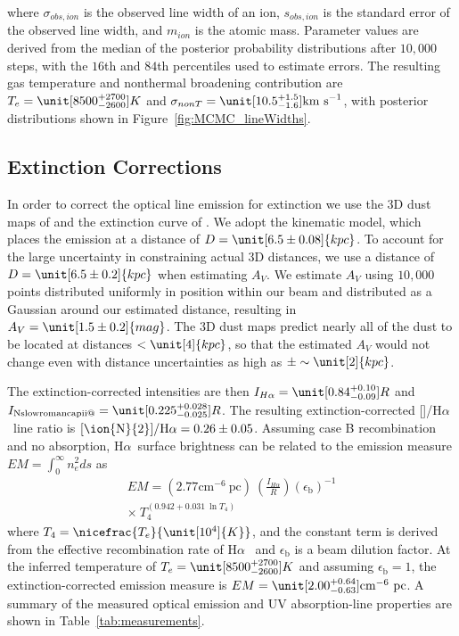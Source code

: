 \documentclass[twocolumn]{aastex63}
\makeatletter
\newcommand{\nii}{\ion{N}{2}}
\newcommand{\ha}{H\ensuremath{\alpha}}
\newcommand{\kms}{\mathrm{km~s}\ensuremath{^{-1}}}
\newcommand*{\rom}[1]{\expandafter\@slowromancap\romannumeral #1@}
\makeatother
\begin{document}
where $\sigma_{obs,ion}$ is the observed line width of an ion, $s_{obs,ion}$ is the standard error of the observed line width, and $m_{ion}$ is the atomic mass. Parameter values are derived from the median of the posterior probability distributions after $10,000$ steps, with the $16$th and $84$th percentiles used to estimate errors. The resulting gas temperature and nonthermal broadening contribution are $T_e = \unit[8500^{+2700}_{-2600}]{K}$ and $\sigma_{nonT} = \unit[10.5^{+1.5}_{-1.6}]{\kms}$, with posterior distributions shown in Figure~\ref{fig:MCMC_lineWidths}.

\subsection{Extinction Corrections} \label{sec:methods:extinct}
In order to correct the optical line emission for extinction we use the $3$D dust maps of \citet{Green2019} and the extinction curve of \citet{Fitzpatrick2007}. We adopt the \citet{DiTeodoro2018} kinematic model, which places the emission at a distance of  $D = \unit[6.5 \pm 0.08]{kpc}$. To account for the large uncertainty in constraining actual $3$D distances, we use a distance of $D = \unit[6.5 \pm 0.2]{kpc}$ when estimating $A_V$. We estimate $A_V$ using $10,000$ points distributed uniformly in position within our beam and distributed as a Gaussian around our estimated distance, resulting in $A_V = \unit[1.5 \pm 0.2]{mag}$. The $3$D dust maps predict nearly all of the dust to be located at distances $<\unit[4]{kpc}$, so that the estimated $A_V$ would not change even with distance uncertainties as high as $\pm \sim \unit[2]{kpc}$.

The extinction-corrected intensities are then $I_{\ha} = \unit[0.84^{+0.10}_{-0.09}]{R}$ and $I_{\textrm{N\rom{2}}} = \unit[0.225^{+0.028}_{-0.025}]{R}$. 
The resulting extinction-corrected [\nii]/\ha\ line ratio is $\textrm{[\nii]/\ha} = 0.26 \pm 0.05$. 
Assuming case B recombination and no absorption, \ha\ surface brightness can be related to the emission measure $EM = \int_0^{\infty}{n_e^2 ds}$ as 
\begin{equation}
\begin{split}
    EM = \left(2.77 \textrm{cm}^{-6}~\textrm{pc}\right)~
     \left(\frac{I_{\ha}}{R}\right) \left(\epsilon_{\textrm{b}}\right)^{-1}\\
     \times~T_4^{(0.942 + 0.031~\ln{T_4})}    
\end{split}\label{eq:iha_simp}
\end{equation}
where $T_4 = \nicefrac{T_e}{\unit[10^4]{K}}$, and the constant term is derived from the effective recombination rate of \ha\ \citep{Draine2011} and $\epsilon_{\textrm{b}}$ is a beam dilution factor.
At the inferred temperature of $T_e = \unit[8500^{+2700}_{-2600}]{K}$ and assuming $\epsilon_{\textrm{b}} = 1$, the extinction-corrected emission measure is $EM = \unit[2.00^{+0.64}_{-0.63}]{\textrm{cm}^{-6}~\textrm{pc}}$.
A summary of the measured optical emission and UV absorption-line properties are shown in Table~\ref{tab:measurements}.
\end{document}
